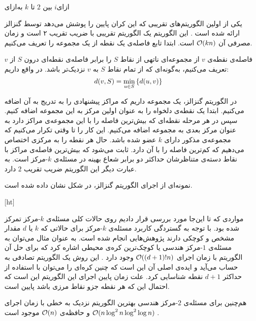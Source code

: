 ‌ازای{$i$ بین $2$ تا $k$}
‌به‌ازای

یکی از اولین الگوریتم‌های تقریبی که این کران پایین را پوشش می‌دهد توسط گنزالز ارائه شده است . این الگوریتم یک الگوریتم تقریبی با ضریب تقریب ۲ است و زمان مصرفی آن $\mathcal{O}(kn)$ است. ابتدا تابع فاصله‌ی یک نقطه از یک مجموعه را تعریف می‌کنیم.

فاصله‌ی نقطه‌ی $v$ از مجموعه‌ای ناتهی از نقاط $S$ را برابر فاصله‌ی نقطه‌ای درون $S$ از $v$ تعریف می‌کنیم، به‌گونه‌ای که از تمام نقاط $S$ به $v$ نزدیک‌تر باشد. در واقع داریم:
$$d(v, S) = \min_{u \in S} \left\{  d(u, v)  \right\}$$

در الگوریتم گنزالز، یک مجموعه داریم که مراکز پیشنهادی را به تدریج به آن اضافه می‌کنیم. ابتدا یک نقطه‌ی دلخواه را به عنوان اولین مرکز به این مجموعه اضافه کنیم. سپس در هر مرحله نقطه‌ای که بیش‌ترین فاصله را با این مجموعه‌ی مراکز دارد به عنوان مرکز بعدی به مجموعه اضافه می‌کنیم. این کار را تا وقتی تکرار می‌کنیم که مجموعه‌ی مذکور دارای $k$ عضو شده باشد. حال هر نقطه را به مرکزی اختصاص می‌دهیم که کم‌ترین فاصله را با آن دارد. ثابت می‌شود که بیش‌ترین فاصله‌ی مراکز با نقاط دسته‌ی متناظرشان حداکثر دو برابر شعاع بهینه در مسئله‌ی $k$-مرکز است. به عبارت دیگر این الگوریتم ضریب تقریب $2$ دارد.

نمونه‌ای از اجرای الگوریتم گنزالز، در شکل  نشان داده شده است.

[ht]

مواردی که تا این‌جا مورد بررسی قرار دادیم روی حالات کلی مسئله‌ی $k$-مرکز تمرکز شده بود. با توجه به گستردگی کاربرد مسئله‌ی $k$-مرکز برای حالاتی که $k$ یا $d$ مقدار مشخص و کوچکی دارند پژوهش‌هایی انجام شده است.
به عنوان مثال می‌توان به مسئله‌ی $1$-مرکز هندسی یا کوچک‌ترین کره‌ی محیطی اشاره کرد که برای حل آن الگوریتم با زمان اجرای  $\mathcal{O}((d+1)! n)$ وجود دارد . این روش یک الگوریتم تصادفی به حساب می‌آید و ایده‌ی اصلی آن این است که چنین کره‌ای را می‌توان با استفاده از حداکثر $d+1$ نقطه شناسایی کرد. علت زمان پایین اجرای این الگوریتم این است که احتمال این که هر نقطه جزو نقاط مرزی باشد پایین است.

هم‌چنین برای مسئله‌ی $2$-مرکز هندسی بهترین الگوریتم نزدیک به خطی با زمان اجرای $\mathcal{O}(n \log^2{n} \log^2{\log{n}})$ و حافظه‌ی $\mathcal{O}(n)$ موجود است .


